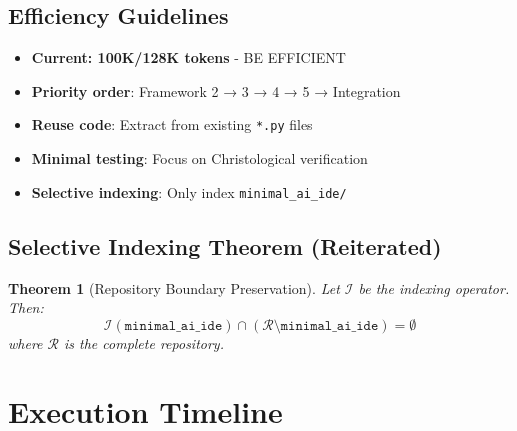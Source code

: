 \documentclass[12pt]{article}
\newtheorem{theorem}{Theorem}
\begin{document}
\subsection{Efficiency Guidelines}
\begin{itemize}
    \item \textbf{Current: 100K/128K tokens} - BE EFFICIENT
    \item \textbf{Priority order}: Framework 2 → 3 → 4 → 5 → Integration
    \item \textbf{Reuse code}: Extract from existing \texttt{*.py} files
    \item \textbf{Minimal testing}: Focus on Christological verification
    \item \textbf{Selective indexing}: Only index \texttt{minimal\_ai\_ide/}
\end{itemize}

\subsection{Selective Indexing Theorem (Reiterated)}
\begin{theorem}[Repository Boundary Preservation]
Let $\mathcal{I}$ be the indexing operator. Then:
\[
\mathcal{I}(\texttt{minimal\_ai\_ide}) \cap (\mathcal{R} \setminus \texttt{minimal\_ai\_ide}) = \emptyset
\]
where $\mathcal{R}$ is the complete repository.
\end{theorem}

\section{Execution Timeline}
\end{document}
